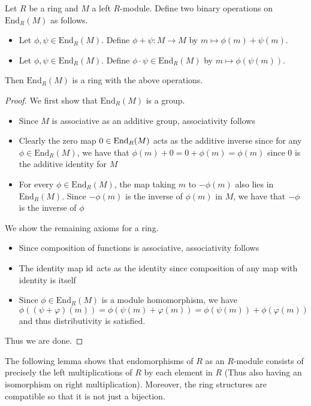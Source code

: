 \documentclass[a4paper]{article}
\begin{document}
\begin{prp}{}{} Let $R$ be a ring and $M$ a left $R$-module. Define two binary operations on $\text{End}_R(M)$ as follows. 
\begin{itemize}
\item Let $\phi,\psi\in\text{End}_R(M)$. Define $\phi+\psi:M\to M$ by $m\mapsto\phi(m)+\psi(m)$. 
\item Let $\phi,\psi\in\text{End}_R(M)$. Define $\phi\cdot\psi\in\text{End}_R(M)$ by $m\mapsto\phi(\psi(m))$. 
\end{itemize}
Then $\text{End}_R(M)$ is a ring with the above operations. \tcbline
\begin{proof}
We first show that $\text{End}_R(M)$ is a group. 
\begin{itemize}
\item Since $M$ is associative as an additive group, associativity follows
\item Clearly the zero map $0\in\operatorname{End}_R(M)$ acts as the additive inverse since for any $\phi\in\text{End}_R(M)$, we have that $\phi(m)+0=0+\phi(m)=\phi(m)$ since $0$ is the additive identity for $M$
\item For every $\phi\in\text{End}_R(M)$, the map taking $m$ to $-\phi(m)$ also lies in $\text{End}_R(M)$. Since $-\phi(m)$ is the inverse of $\phi(m)$ in $M$, we have that $-\phi$ is the inverse of $\phi$
\end{itemize}
We show the remaining axioms for a ring. 
\begin{itemize}
\item Since composition of functions is associative, associativity follows
\item The identity map $\operatorname{id}$ acts as the identity since composition of any map with identity is itself
\item Since $\phi\in\text{End}_R(M)$ is a module homomorphism, we have $$\phi((\psi+\varphi)(m))=\phi(\psi(m)+\varphi(m))=\phi(\psi(m))+\phi(\varphi(m))$$ and thus distributivity is satisfied. 
\end{itemize}
Thus we are done. 
\end{proof}
\end{prp}

The following lemma shows that endomorphisms of $R$ as an $R$-module consists of precisely the left multiplications of $R$ by each element in $R$ (Thus also having an isomorphism on right multiplication). Moreover, the ring structures are compatible so that it is not just a bijection. 
\end{document}
